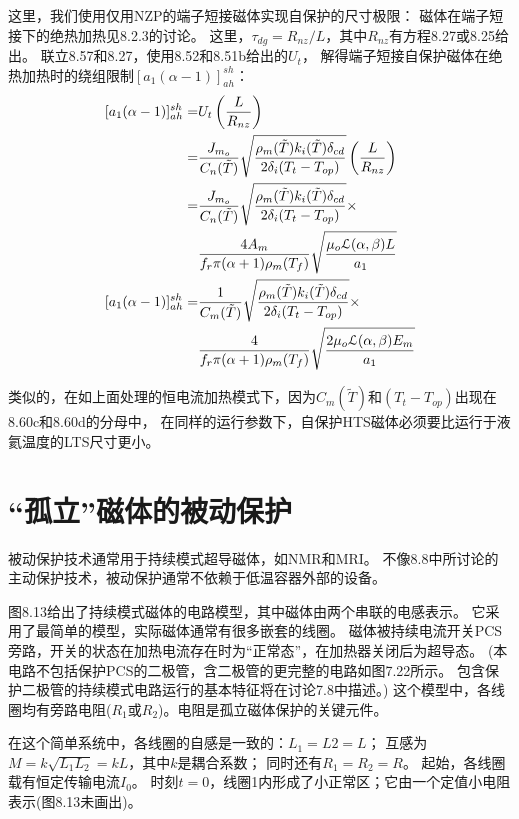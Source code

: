 这里，我们使用仅用NZP的端子短接磁体实现自保护的尺寸极限：
磁体在端子短接下的绝热加热见8.2.3的讨论。
这里，$\tau_{dg}=R_{nz}/L$，其中$R_{nz}$有方程8.27或8.25给出。
联立8.57和8.27，使用8.52和8.51b给出的$U_t$，
解得端子短接自保护磁体在绝热加热时的绕组限制$[a_1(\alpha-1)]_{ah}^{sh}$：
\begin{subequations}%
	\begin{align}
[a_1(\alpha-1)]_{ah}^{sh}=&U_t\left(\frac{L}{R_{nz}}\right) \\
=&\frac{J_{m_o}}{C_n(\tilde{T})}\sqrt{\frac{\rho_m(\tilde{T})k_i(\tilde{T})\delta_{cd}}{2\delta_i(T_t-T_{op})}}\left(\frac{L}{R_{nz}}\right)  \\
=&\frac{J_{m_o}}{C_n(\tilde{T})}\sqrt{\frac{\rho_m(\tilde{T})k_i(\tilde{T})\delta_{cd}}{2\delta_i(T_t-T_{op})}}\times \\\notag
&\frac{4A_m}{f_r\pi(\alpha+1)\rho_m(T_f)}\sqrt{\frac{\mu_o\mathcal{L}(\alpha,\beta)L}{a_1}}\\
[a_1(\alpha-1)]_{ah}^{sh}=&\frac{1}{C_m(\tilde{T})}\sqrt{\frac{\rho_m(\tilde{T})k_i(\tilde{T})\delta_{cd}}{2\delta_i(T_t-T_{op})}}\times \\\notag
&\frac{4}{f_r\pi(\alpha+1)\rho_m(T_f)}\sqrt{\frac{2\mu_o\mathcal{L}(\alpha,\beta)E_m}{a_1}}
\end{align}
\end{subequations}

类似的，在如上面处理的恒电流加热模式下，因为$C_m(\tilde{T})$和$(T_t-T_{op})$出现在8.60c和8.60d的分母中，
在同样的运行参数下，自保护HTS磁体必须要比运行于液氦温度的LTS尺寸更小。


\section{“孤立”磁体的被动保护}
被动保护技术通常用于持续模式超导磁体，如NMR和MRI。
不像8.8中所讨论的主动保护技术，被动保护通常不依赖于低温容器外部的设备。

图8.13给出了持续模式磁体的电路模型，其中磁体由两个串联的电感表示。
它采用了最简单的模型，实际磁体通常有很多嵌套的线圈。
磁体被持续电流开关PCS旁路，开关的状态在加热电流存在时为“正常态”，在加热器关闭后为超导态。
(本电路不包括保护PCS的二极管，含二极管的更完整的电路如图7.22所示。
包含保护二极管的持续模式电路运行的基本特征将在讨论7.8中描述。)
这个模型中，各线圈均有旁路电阻($R_1$或$R_2$)。电阻是孤立磁体保护的关键元件。

在这个简单系统中，各线圈的自感是一致的：$L_1=L2=L$；
互感为$M=k\sqrt{L_1L_2}=kL$，其中$k$是耦合系数；
同时还有$R_1=R_2=R$。
起始，各线圈载有恒定传输电流$I_0$。
时刻$t=0$，线圈1内形成了小正常区；它由一个定值小电阻表示(图8.13未画出)。

